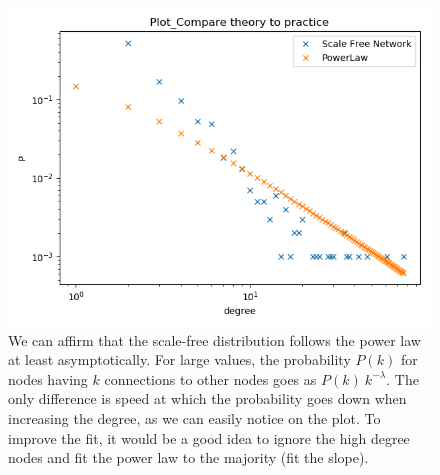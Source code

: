 \documentclass[10pt,a4paper]{article}
\begin{document}
\begin{enumerate}
\begin{figure}[H]
	\centering
	\includegraphics[width=0.7\linewidth]{"../Scripts/Plot_Compare theory to practice"}
	\caption[Theory vs Practice]{ We can affirm that the scale-free distribution follows the power law at least asymptotically. For large values, the probability $P(k)$ for nodes having $ k $ connections to other nodes goes as $P(k) ~ k^{-\lambda}$. The only difference is speed at which the probability goes down when increasing the degree, as we can easily notice on the plot. To improve the fit, it would be a good idea to ignore the high degree nodes and fit the power law to the majority (fit the slope). }
	\label{fig:compare-theory-to-practice}
\end{figure}

\end{enumerate}
\end{document}
